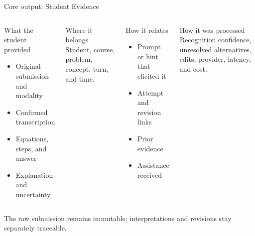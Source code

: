 \documentclass[aspectratio=169,10pt]{beamer}
\begin{document}
\begin{frame}{Core output: Student Evidence}
\small
\begin{columns}[T,onlytextwidth]
\begin{block}{What the student provided}
\begin{itemize}
\item Original submission and modality
\item Confirmed transcription
\item Equations, steps, and answer
\item Explanation and uncertainty
\end{itemize}
\end{block}
\begin{block}{Where it belongs}
Student, course, problem, concept, turn, and time.
\end{block}
\begin{block}{How it relates}
\begin{itemize}
\item Prompt or hint that elicited it
\item Attempt and revision links
\item Prior evidence
\item Assistance received
\end{itemize}
\end{block}
\begin{block}{How it was processed}
Recognition confidence, unresolved alternatives, edits, provider, latency, and cost.
\end{block}
\end{columns}
\vspace{.3em}
\centering
The raw submission remains immutable; interpretations and revisions stay separately traceable.
\end{frame}
\end{document}
